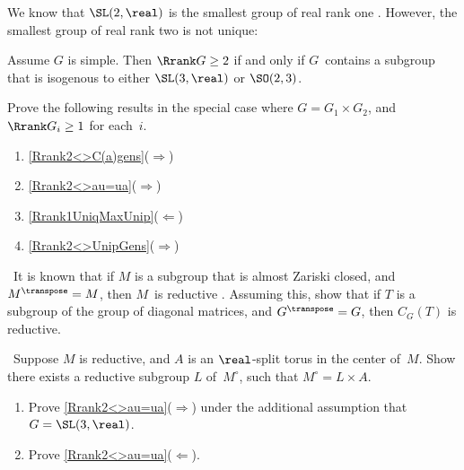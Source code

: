 We know that $\SL(2,\real)$ is the smallest group of real rank one . However, the smallest group of real rank two is not unique:

\begin{prop} \label{Rrank2<>SL3orSO23}
Assume $G$ is simple. Then\/ $\Rrank G \ge 2$ if and only if $G$~contains a subgroup that is isogenous to either\/ $\SL(3,\real)$ or\/ $\SO(2,3)$.
\end{prop}


\begin{exercises}

\item \label{CentGensG1xG2Ex}
Prove the following results in the special case where $G = G_1 \times G_2$, and $\Rrank G_i \ge 1$ for each~$i$.
	\begin{enumerate}
	\item \label{CentGensG1xG2Ex-C(a)}
	\cref{Rrank2<>C(a)gens}($\Rightarrow$)
	\item \cref{Rrank2<>au=ua}($\Rightarrow$)
	\item \cref{Rrank1UniqMaxUnip}($\Leftarrow$)
	\item \cref{Rrank2<>UnipGens}($\Rightarrow$)
	\end{enumerate}

\item \label{C(T)reductive} \optional\ 
It is known that if $M$ is a subgroup that is almost Zariski closed, and $M^\transpose = M$, then $M$~is reductive . Assuming this, show that if $T$ is a subgroup of the group of diagonal matrices, and $G^\transpose = G$, then $C_G(T)$ is reductive.

\item \label{C=MA} \optional\ 
Suppose $M$ is reductive, and $A$ is an $\real$-split torus in the center of~$M$. Show there exists a reductive subgroup $L$ of~$M^\circ$, such that $M^\circ = L \times A$.

\item \label{Rrank2<>au=uaEx}
	\begin{enumerate}
	\item Prove \cref{Rrank2<>au=ua}($\Rightarrow$) under the additional assumption that $G = \SL(3,\real)$.
	\item \label{Rrank2<>au=uaEx-not1}
	Prove \cref{Rrank2<>au=ua}($\Leftarrow$).
	\end{enumerate}


\end{exercises}
